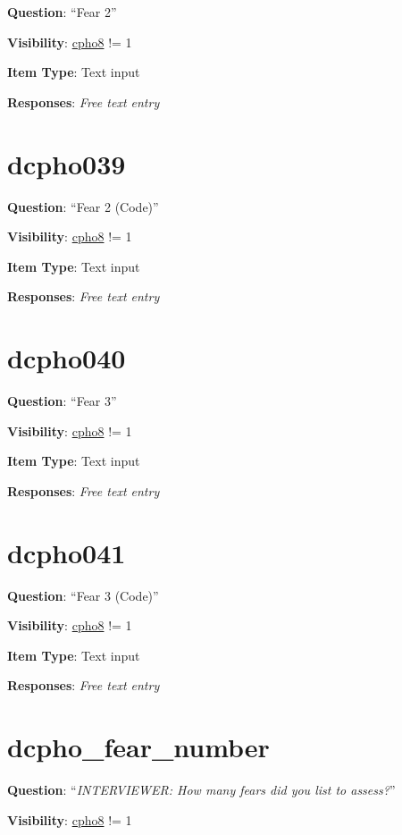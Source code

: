 \documentclass[]{book}
\begin{document}
\textbf{Question}: ``Fear 2''

\textbf{Visibility}: \protect\hyperlink{cpho8}{cpho8} != 1

\textbf{Item Type}: Text input

\textbf{Responses}: \emph{Free text entry}

\hypertarget{dcpho039}{%
\section{dcpho039}\label{dcpho039}}

\textbf{Question}: ``Fear 2 (Code)''

\textbf{Visibility}: \protect\hyperlink{cpho8}{cpho8} != 1

\textbf{Item Type}: Text input

\textbf{Responses}: \emph{Free text entry}

\hypertarget{dcpho040}{%
\section{dcpho040}\label{dcpho040}}

\textbf{Question}: ``Fear 3''

\textbf{Visibility}: \protect\hyperlink{cpho8}{cpho8} != 1

\textbf{Item Type}: Text input

\textbf{Responses}: \emph{Free text entry}

\hypertarget{dcpho041}{%
\section{dcpho041}\label{dcpho041}}

\textbf{Question}: ``Fear 3 (Code)''

\textbf{Visibility}: \protect\hyperlink{cpho8}{cpho8} != 1

\textbf{Item Type}: Text input

\textbf{Responses}: \emph{Free text entry}

\hypertarget{dcpho_fear_number}{%
\section{dcpho\_fear\_number}\label{dcpho_fear_number}}

\textbf{Question}: ``\emph{INTERVIEWER: How many fears did you list to assess?}''

\textbf{Visibility}: \protect\hyperlink{cpho8}{cpho8} != 1
\end{document}
